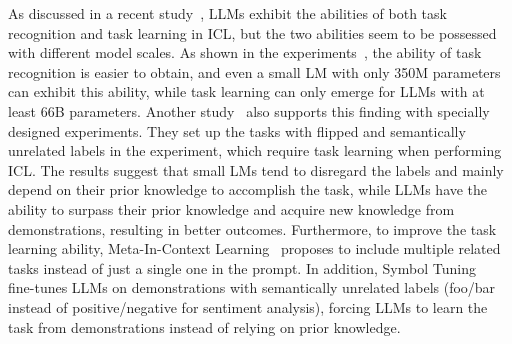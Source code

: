 As discussed in a recent study~\cite{Pan-2023-arXiv-what}, LLMs exhibit the abilities of both task recognition and task learning in ICL, but the two abilities seem to be possessed with different model scales.
As shown in the experiments~\cite{Pan-2023-arXiv-what}, the ability of task recognition is easier to obtain, and even a small LM with only 350M parameters can exhibit this ability, while task learning can only emerge for LLMs with at least 66B parameters.
Another study~\cite{Wei-arxiv-2023-Larger} also supports this finding with specially designed experiments.
They set up the tasks with flipped and semantically unrelated labels in the experiment, which require task learning when performing ICL.
The results suggest that small LMs tend to disregard the labels and mainly depend on their prior knowledge to accomplish the task, while LLMs have the ability to surpass their prior knowledge and acquire new knowledge from demonstrations, resulting in better outcomes. 
Furthermore, to improve the task learning ability, Meta-In-Context Learning~\cite{Forno-2023-arXiv-meta} proposes to include multiple related tasks instead of just a single one in the prompt.
In addition, Symbol Tuning~\cite{Wei-2023-arXiv-symbol} fine-tunes LLMs on demonstrations with semantically unrelated labels (\eg foo/bar instead of positive/negative for sentiment analysis), forcing LLMs to learn the task from demonstrations instead of relying on prior knowledge.